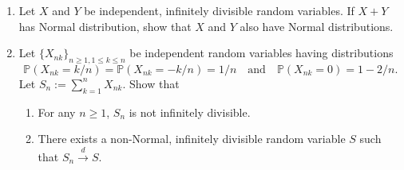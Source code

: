 \begin{enumerate}
    \item  Let \(X\) and \(Y\) be independent, infinitely divisible random variables. If \(X + Y\) has Normal distribution, show that \(X\) and \(Y\) also have Normal distributions.

    \item  Let \(\{X_{nk}\}_{n \ge 1, 1 \le k \le n}\) be independent random variables having distributions
    \[
    \mathbb{P}(X_{nk} = k/n) = \mathbb{P}(X_{nk} = -k/n) = 1/n \quad \text{and} \quad \mathbb{P}(X_{nk} = 0) = 1 - 2/n.
    \]
    Let \(\displaystyle S_n := \sum_{k=1}^n X_{nk}\). Show that
    \begin{enumerate}
        \item[(i)] For any \(n \ge 1\), \(S_n\) is not infinitely divisible.
        \item[(ii)] There exists a non-Normal, infinitely divisible random variable \(S\) such that \(\displaystyle S_n \xrightarrow{d} S\).
    \end{enumerate}
\end{enumerate}